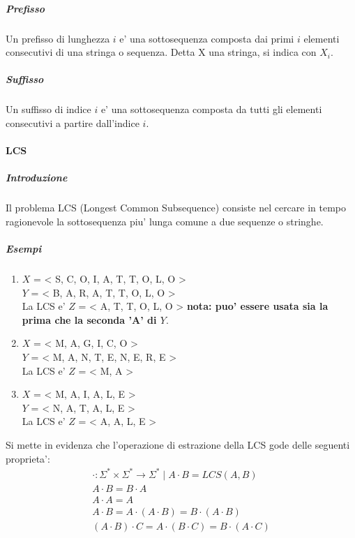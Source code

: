 \subparagraph{Prefisso}

Un prefisso di lunghezza $i$ e' una sottosequenza composta dai primi $i$ elementi consecutivi di una stringa o sequenza.
Detta X una stringa, si indica con $X_{i}$.

\subparagraph{Suffisso}

Un suffisso di indice $i$ e' una sottosequenza composta da tutti gli elementi consecutivi a partire dall'indice $i$.

\paragraph{LCS}

\subparagraph{Introduzione}

Il problema LCS (Longest Common Subsequence) consiste nel cercare in tempo ragionevole la sottosequenza piu' lunga comune a due sequenze o stringhe.

\subparagraph{Esempi}

\begin{enumerate}

\item

$X$ = < S, C, O, I, A, T, T, O, L, O > \\
$Y$ = < B, A, R, A, T, T, O, L, O > \\
La LCS e' $Z$ = < A, T, T, O, L, O >
\textbf{nota: puo' essere usata sia la prima che la seconda 'A' di $Y$}.

\item

$X$ = < M, A, G, I, C, O > \\
$Y$ = < M, A, N, T, E, N, E, R, E > \\
La LCS e' $Z$ = < M, A >

\item

$X$ = < M, A, I, A, L, E > \\
$Y$ = < N, A, T, A, L, E > \\
La LCS e' $Z$ = < A, A, L, E >

\end{enumerate}

Si mette in evidenza che l'operazione di estrazione della LCS gode delle seguenti proprieta':
\begin{align}
    \text{$\cdot : \Sigma^* \times \Sigma^* \rightarrow \Sigma^* \mid A \cdot B = LCS(A, B)$} \\
    \text{$A \cdot B = B \cdot A$} \\
    \text{$A \cdot A = A$} \\
    \text{$A \cdot B = A \cdot (A \cdot B) = B \cdot (A \cdot B)$} \\
    \text{$(A \cdot B) \cdot C = A \cdot (B \cdot C) = B \cdot (A \cdot C)$}
\end{align}

